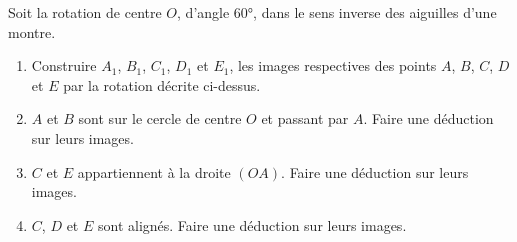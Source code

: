 \begin{exercice*}
    Soit la rotation de centre $O$, d'angle \ang{60}, dans le sens inverse des aiguilles d'une montre.
    \begin{center}
        \begin{Geometrie}[CoinHD={(9u,7u)}]        
            \enonceTroisiemeGTroisExoTreize
        \end{Geometrie}
    \end{center}
    \begin{enumerate}
        \item Construire $A_1$, $B_1$, $C_1$, $D_1$ et $E_1$, les images respectives des points $A$, $B$, $C$, $D$ et $E$ par la rotation décrite ci-dessus.
        \item $A$ et $B$ sont sur le cercle de centre $O$ et passant par $A$. Faire une déduction sur leurs images.
        \item $C$ et $E$ appartiennent à la droite $(OA)$. Faire une déduction sur leurs images.
        \item $C$, $D$ et $E$ sont alignés. Faire une déduction sur leurs images.
    \end{enumerate}
\end{exercice*}
